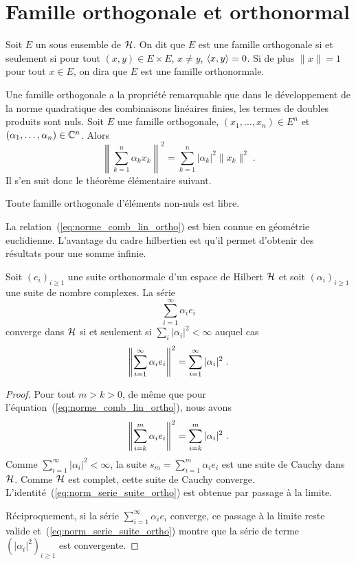 \section{Famille orthogonale et orthonormal}
\begin{definition}
Soit $E$ un sous ensemble de $\mathcal{H}$. On dit que $E$
est une famille orthogonale si et seulement si pour tout $(x,y) \in E \times E$,
$x \ne y$, $\left\langle x, y \right\rangle= 0$. Si de plus   $\|x\|=1$ pour tout $x \in E$, on
dira que $E$ est une famille orthonormale.
\end{definition}
Une famille orthogonale a la propri\'{e}t\'{e} remarquable que dans le d\'{e}veloppement de
la norme quadratique des combinaisons lin\'{e}aires finies, les termes de doubles
produits sont nuls. Soit $E$ une famille orthogonale, $(x_1,\dots,x_n) \in E^n$
et $(\alpha_1,\dots,\alpha_n) \in \mathbb{C}^n$. Alors
\begin{equation}
  \label{eq:norme_comb_lin_ortho}
\left\|\sum_{k=1}^n\alpha_k x_k\right\|^2= \sum_{k=1}^n |\alpha_k|^2
\|x_k\|^2\;.
\end{equation}
Il s'en suit donc le th\'{e}or\`{e}me \'{e}l\'{e}mentaire suivant.
\begin{theorem}
  Toute famille orthogonale d'\'{e}l\'{e}ments non-nuls est libre.
\end{theorem}
La relation~(\ref{eq:norme_comb_lin_ortho}) est bien connue en g\'{e}om\'{e}trie
euclidienne. L'avantage du cadre hilbertien est qu'il permet d'obtenir des
r\'{e}sultats pour une somme infinie.
\begin{theorem}
\label{theo:convergence-series-fourier}
Soit $(e_i)_{i\geq1}$ une suite orthonormale d'un espace de Hilbert $\mathcal{H}$ et
soit $(\alpha_i)_{i\geq1}$ une suite de nombre complexes. La s\'{e}rie
\begin{equation}
  \label{eq:serie_suite_ortho}
  \sum_{i=1}^\infty  \alpha_i e_i
\end{equation}
converge dans $\mathcal{H}$ si et seulement si $\sum_{i} |\alpha_i|^2 <
\infty$ auquel cas
\begin{equation}
  \label{eq:norm_serie_suite_ortho}
\left\| \sum_{i=1}^\infty \alpha_i e_i \right\|^2 =
\sum_{i=1}^\infty |\alpha_i|^2 \;.
\end{equation}
\end{theorem}
\begin{proof}
Pour tout $m > k > 0$, de m\^{e}me que pour
l'\'{e}quation~(\ref{eq:norme_comb_lin_ortho}), nous avons
\[
\left\| \sum_{i=k}^m \alpha_i e_i \right\|^2 = \sum_{i=k}^m |\alpha_i|^2 \;.
\]
Comme $\sum_{i=1}^\infty |\alpha_i|^2 < \infty$, la suite $s_m= \sum_{i=1}^m
\alpha_i e_i$ est une suite de Cauchy dans $\mathcal{H}$. Comme $\mathcal{H}$ est complet,
cette suite de Cauchy converge. L'identit\'{e}~(\ref{eq:norm_serie_suite_ortho})
est obtenue par passage \`{a} la limite.

R\'{e}ciproquement, si la s\'{e}rie $\sum_{i=1}^\infty \alpha_i e_i$ converge, ce
passage \`{a} la limite reste valide
et~(\ref{eq:norm_serie_suite_ortho}) montre que la s\'{e}rie de terme
$(|\alpha_i|^2)_{i\geq1}$ est convergente.

\end{proof}
